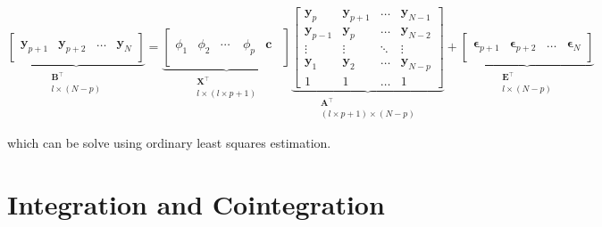 \begin{equation}
 \label{eq:varmatrix}
               \underbrace{ \begin{bmatrix}
               \quad \\
               \mathbf{y}_{p+1} &
               \mathbf{y}_{p+2} &
               \dots & 
               \mathbf{y}_N \\
               \quad
               \end{bmatrix}}_{\substack{ \mathbf{B}^\top\\l \times (N-p)}}   
= 
                \underbrace{\left[ 
                \begin{array}{ccccc}
                \quad & \quad & \quad & \quad & \quad \\
                \phi_1  & \phi_2 & \cdots & \phi_p & \mathbf{c} \\  
                \quad &\quad & \quad & \quad & \quad
               \end{array} 
               \right]}_{\substack{ \mathbf{X}^\top\\ l \times (l \times p + 1 )}}
\underbrace{\begin{bmatrix}
   \mathbf{y}_{p}  & \mathbf{y}_{p+1} & \dots    & \mathbf{y}_{N-1}\\
   \mathbf{y}_{p-1}  & \mathbf{y}_{p} & \dots    & \mathbf{y}_{N-2}\\
   \vdots        & \vdots   & \ddots   & \vdots\\
   \mathbf{y}_{1} & \mathbf{y}_{2}   & \dots    & \mathbf{y}_{N-p}\\
   1 & 1   & \dots    & 1 
   \end{bmatrix}}_{\substack{ \mathbf{A}^\top\\ (l\times p +1 )\times (N-p)}}
+
\underbrace{\begin{bmatrix}
                \quad \\
              \mathbf{\epsilon}_{p+1}  & 
              \mathbf{\epsilon}_{p+2}  & 
              \dots                & 
              \mathbf{\epsilon}_N \\
              \quad
             \end{bmatrix}}_{\substack{\mathbf{E}^\top\\l \times (N-p) }} 
\end{equation}

\noindent which can be solve using ordinary least squares estimation.


\section{Integration and Cointegration}

